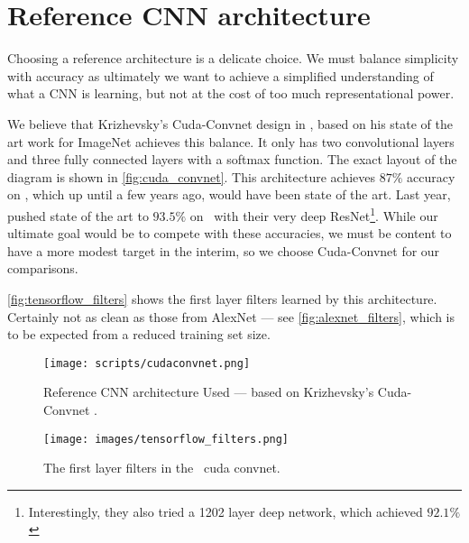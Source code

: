 \section{Reference CNN architecture}\label{sec:reference_cnn}
  Choosing a reference architecture is a delicate choice. We must balance
  simplicity with accuracy as ultimately we want to achieve a simplified
  understanding of what a CNN is learning, but not at the cost of too much
  representational power.

  We believe that Krizhevsky's Cuda-Convnet design in \cite{krizhevsky_cuda_2014}, based
  on his state of the art work for ImageNet \cite{krizhevsky_imagenet_2012}
  achieves this balance. It only has two convolutional layers and three fully
  connected layers with a softmax function. The exact layout of the diagram is
  shown in \autoref{fig:cuda_convnet}. This architecture achieves $87\%$
  accuracy on \cifar, which up until a few years ago, would have been state of
  the art. Last year, \cite{he_deep_2015} pushed state of the art to $93.5\%$
  on \cifar\ with their very deep ResNet\footnote{Interestingly, they also tried a 1202
  layer deep network, which achieved $92.1\%$}. While our ultimate goal would
  be to compete with these accuracies, we must be content to have a more modest
  target in the interim, so we choose Cuda-Convnet for our comparisons. 
  
  \autoref{fig:tensorflow_filters} shows the first layer
  filters learned by this architecture. Certainly not as clean as those from
  AlexNet --- see  \autoref{fig:alexnet_filters}, which is to be expected from
  a reduced training set size. 

  \begin{figure}
    \centering
      \texttt{[image: scripts/cudaconvnet.png]}
      \caption[Reference CNN architecture Used]
              {Reference CNN architecture Used --- based on Krizhevsky's
              Cuda-Convnet \citep{krizhevsky_cuda_2014}.}
      \label{fig:cuda_convnet}
  \end{figure}
\begin{figure}
  \centering
    \texttt{[image: images/tensorflow\_filters.png]}
    \caption[The first layer filters in the \cifar\ cuda convnet]
            {The first layer filters in the \cifar\ cuda convnet.}
    \label{fig:tensorflow_filters}
\end{figure}

